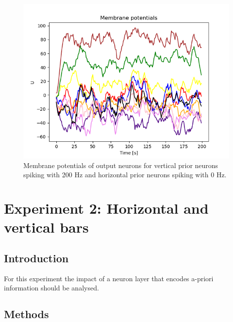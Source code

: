 \begin{figure}
  \includegraphics[width=\linewidth]{figures/horvertAdaptiveInh/membranePotentials0.png}
  \caption{ Membrane potentials of output neurons for vertical prior neurons spiking with 200 Hz and horizontal prior neurons spiking with 0 Hz. }
  \label{fig:horvertAdaptiveInhibitionVariablePriorValMembranePotentials}
\end{figure}













\iffalse
\section{Experiment 2: Horizontal and vertical bars}
\label{section:horvert}

 \subsection{Introduction}

For this experiment the impact of a neuron layer that encodes a-priori information should be analysed.

\subsection{Methods}


